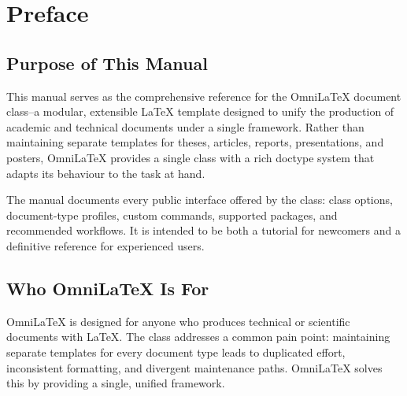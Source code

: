 \chapter*{Preface}

\section{Purpose of This Manual}

This manual serves as the comprehensive reference for the OmniLaTeX document
class--a modular, extensible \LaTeX{} template designed to unify the production
of academic and technical documents under a single framework.  Rather than
maintaining separate templates for theses, articles, reports, presentations, and
posters, OmniLaTeX provides a single class with a rich doctype system that
adapts its behaviour to the task at hand.

The manual documents every public interface offered by the class: class
options, document-type profiles, custom commands, supported packages, and
recommended workflows.  It is intended to be both a tutorial for newcomers and
a definitive reference for experienced users.

\section{Who OmniLaTeX Is For}

OmniLaTeX is designed for anyone who produces technical or scientific documents
with \LaTeX{}.  The class addresses a common pain point: maintaining separate
templates for every document type leads to duplicated effort, inconsistent
formatting, and divergent maintenance paths.  OmniLaTeX solves this by
providing a single, unified framework.

